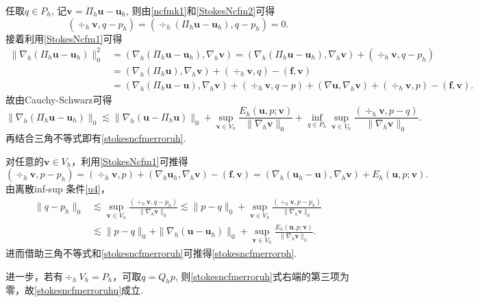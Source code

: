 \begin{prf}
任取$q\in P_h$, 记$\boldsymbol{v}=\Pi_h\boldsymbol{u}-\boldsymbol{u}_h$, 则由\eqref{ncfmk1}和\eqref{StokesNcfm2}可得
\begin{equation*}
(\div_h\boldsymbol{v}, q-p_h)=(\div_h(\Pi_h\boldsymbol{u}-\boldsymbol{u}_h), q-p_h)=0.
\end{equation*}
接着利用\eqref{StokesNcfm1}可得
\begin{align*}
\|\nabla_h(\Pi_{h}\boldsymbol{u}-\boldsymbol{u}_h)\|_0^2&=(\nabla_h(\Pi_{h}\boldsymbol{u}-\boldsymbol{u}_h), \nabla_h\boldsymbol{v}) = (\nabla_h(\Pi_{h}\boldsymbol{u}-\boldsymbol{u}_h), \nabla_h\boldsymbol{v}) + (\div_h\boldsymbol{v}, q-p_h) \\
&= (\nabla_h(\Pi_{h}\boldsymbol{u}), \nabla_h\boldsymbol{v}) + (\div_h\boldsymbol{v}, q)-(\boldsymbol{f},\boldsymbol{v}) \\
&= (\nabla_h(\Pi_{h}\boldsymbol{u}-\boldsymbol{u}), \nabla_h\boldsymbol{v}) + (\div_h\boldsymbol{v}, q-p) + (\nabla\boldsymbol{u}, \nabla_h\boldsymbol{v}) + (\div_h\boldsymbol{v}, p) -(\boldsymbol{f},\boldsymbol{v}).
\end{align*}
故由Cauchy-Schwarz可得
\begin{equation*}
\|\nabla_h(\Pi_{h}\boldsymbol{u}-\boldsymbol{u}_h)\|_0\lesssim \|\nabla_h(\boldsymbol{u}-\Pi_{h}\boldsymbol{u})\|_0 + \sup_{\boldsymbol{v}\in V_h}\frac{E_h(\boldsymbol{u},p;\boldsymbol{v})}{\|\nabla_h\boldsymbol{v}\|_0} + \inf_{q\in P_h}\sup_{\boldsymbol{v}\in V_h}\frac{(\div_h\boldsymbol{v},p-q)}{\|\nabla_h\boldsymbol{v}\|_0}.
\end{equation*}
再结合三角不等式即有\eqref{stokesncfmerroruh}.

对任意的$\boldsymbol{v} \in  V_h$，利用\eqref{StokesNcfm1}可推得
\begin{equation*}	
(\div_h\boldsymbol{v}, p-p_h)=(\div_h\boldsymbol{v}, p)+(\nabla_h\boldsymbol{u}_h,\nabla_h\boldsymbol{v})-(\boldsymbol{f},\boldsymbol{v}) =(\nabla_h(\boldsymbol{u}_h-\boldsymbol{u}),\nabla_h\boldsymbol{v}) + E_h(\boldsymbol{u},p;\boldsymbol{v}).
\end{equation*}
由离散inf-sup 条件\eqref{u4}，
\begin{align*}
\|q-p_h\|_{0}&\lesssim\sup _{\boldsymbol{v} \in  V_h}
\frac{(\div_h\boldsymbol{v}, q-p_h)}{\|\nabla_h\boldsymbol{v}\|_0}\lesssim \|p-q\|_0+\sup _{\boldsymbol{v} \in  V_h}
\frac{(\div_h\boldsymbol{v}, p-p_h)}{\|\nabla_h\boldsymbol{v}\|_0} \\
&\lesssim \|p-q\|_0 + \|\nabla_h(\boldsymbol{u}-\boldsymbol{u}_h)\|_0 + \sup_{\boldsymbol{v}\in V_h}\frac{E_h(\boldsymbol{u},p;\boldsymbol{v})}{\|\nabla_h\boldsymbol{v}\|_0}.
\end{align*}
进而借助三角不等式和\eqref{stokesncfmerroruh}可推得\eqref{stokesncfmerrorph}.

进一步，若有$\div_h V_h=P_h$，可取$q=Q_hp$, 则\eqref{stokesncfmerroruh}式右端的第三项为零，故\eqref{stokesncfmerroruhu}成立.
\end{prf}

